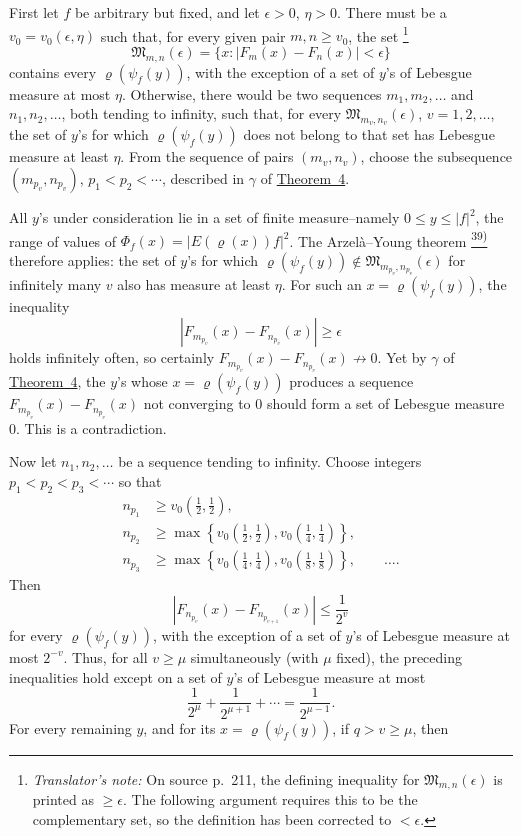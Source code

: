 \documentclass[12pt,b5paper,twoside]{article}
\newcommand{\noteref}[1]{%
  \hyperlink{note:#1}{\textsuperscript{#1)}}}
\newcommand{\translatorfootnote}[2]{%
  \begingroup
  \renewcommand{\thefootnote}{#1}%
  \footnote{\hspace{0.8em}\textit{Translator's note:} #2}%
  \endgroup}
\begin{document}
First let \(f\) be arbitrary but fixed, and let \(\epsilon>0\),
\(\eta>0\).  There must be a \(v_0=v_0(\epsilon,\eta)\) such that, for
every given pair \(m,n\geq v_0\), the set\translatorfootnote{T9}{On source p.~211,
the defining inequality for $\mathfrak M_{m,n}(\epsilon)$ is printed as
$\geq\epsilon$.  The following argument requires this to be the complementary set,
so the definition has been corrected to $<\epsilon$.}
\[
 \mathfrak M_{m,n}(\epsilon)
 =\{x:|F_m(x)-F_n(x)|<\epsilon\}
\]
contains every \(\varrho(\psi_f(y))\), with the exception of a set of
\(y\)'s of Lebesgue measure at most \(\eta\).  Otherwise, there would be
two sequences \(m_1,m_2,\ldots\) and \(n_1,n_2,\ldots\), both tending to
infinity, such that, for every
\(\mathfrak M_{m_v,n_v}(\epsilon)\), \(v=1,2,\ldots\), the set of
\(y\)'s for which \(\varrho(\psi_f(y))\) does not belong to that set has
Lebesgue measure at least \(\eta\).  From the sequence of pairs
\((m_v,n_v)\), choose the subsequence \((m_{p_v},n_{p_v})\),
\(p_1<p_2<\cdots\), described in
\hyperref[thm:4.gamma]{\(\gamma\)} of
\hyperref[thm:4]{Theorem~4}.

All \(y\)'s under consideration lie in a
set of finite measure--namely \(0\leq y\leq|f|^2\), the range of values of
\(\Phi_f(x)=|E(\varrho(x))f|^2\).  The Arzel\`a--Young theorem\noteref{39}
therefore applies: the set of \(y\)'s for which
\(\varrho(\psi_f(y))\notin\mathfrak M_{m_{p_v},n_{p_v}}(\epsilon)\) for
infinitely many \(v\) also has measure at least \(\eta\).  For such an
\(x=\varrho(\psi_f(y))\), the inequality
\[
 |F_{m_{p_v}}(x)-F_{n_{p_v}}(x)|\geq\epsilon
\]
holds infinitely often, so certainly
\(F_{m_{p_v}}(x)-F_{n_{p_v}}(x)\not\to0\).  Yet by
\hyperref[thm:4.gamma]{\(\gamma\)} of
\hyperref[thm:4]{Theorem~4}, the \(y\)'s whose
\(x=\varrho(\psi_f(y))\) produces a sequence
\(F_{m_{p_v}}(x)-F_{n_{p_v}}(x)\) not converging to \(0\) should form a
set of Lebesgue measure \(0\).  This is a contradiction.

Now let \(n_1,n_2,\ldots\) be a sequence tending to infinity.  Choose
integers \(p_1<p_2<p_3<\cdots\) so that
\begin{align*}
 n_{p_1}&\geq v_0\left(\frac12,\frac12\right),\\
 n_{p_2}&\geq
 \max\left\{v_0\left(\frac12,\frac12\right),
              v_0\left(\frac14,\frac14\right)\right\},\\
 n_{p_3}&\geq
 \max\left\{v_0\left(\frac14,\frac14\right),
              v_0\left(\frac18,\frac18\right)\right\},
 \qquad\ldots.
\end{align*}
Then
\[
 |F_{n_{p_v}}(x)-F_{n_{p_{v+1}}}(x)|\leq\frac1{2^v}
\]
for every \(\varrho(\psi_f(y))\), with the exception of a set of \(y\)'s of
Lebesgue measure at most \(2^{-v}\).  Thus, for all \(v\geq\mu\)
simultaneously (with \(\mu\) fixed), the preceding inequalities hold
except on a set of \(y\)'s of Lebesgue measure at most
\[
 \frac1{2^\mu}+\frac1{2^{\mu+1}}+\cdots=\frac1{2^{\mu-1}}.
\]
For every remaining \(y\), and for its
\(x=\varrho(\psi_f(y))\), if \(q>v\geq\mu\), then
\end{document}
